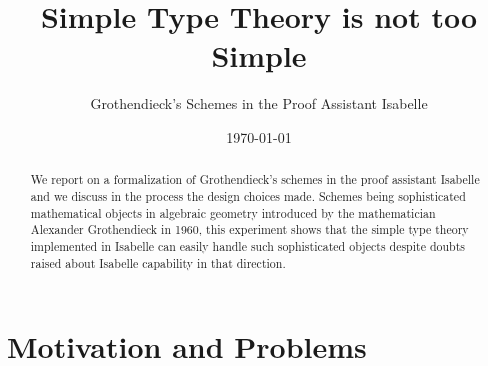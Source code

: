 \documentclass[12pt]{scrartcl}
\begin{document}
\title{Simple Type Theory is not too Simple}
\subtitle{Grothendieck's Schemes in the Proof Assistant Isabelle}
\author{}
\date{\today}
\maketitle

\begin{abstract}
 	We report on a formalization of Grothendieck's schemes in the proof assistant Isabelle and we discuss in the process the design choices made. Schemes being sophisticated mathematical objects in algebraic geometry introduced by the mathematician Alexander Grothendieck in 1960, this experiment shows that the simple type theory implemented in Isabelle can easily handle such sophisticated objects despite doubts raised about Isabelle capability in that direction.   
\end{abstract}

\section{Motivation and Problems}
\label{sec:intro}
\end{document}
